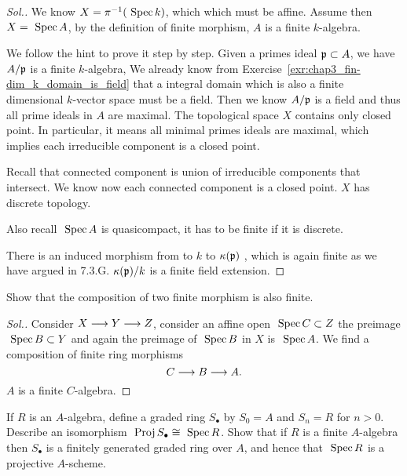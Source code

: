 \documentclass[11pt]{book} %
\begin{document}
\begin{proof}[Sol.]
We know $X=\pi^{-1}(\text{ Spec\,} k)$, which which must be affine. Assume then $X=\text{ Spec\,} A$, by the definition of finite morphism, $A$ is a finite $k$-algebra. 

We follow the hint to prove it step by step. Given a primes ideal ${\mathfrak p}\subset A$, we have $A/{\mathfrak p}$ is a finite $k$-algebra, We already know from Exercise~\ref{exr:chap3_fin-dim_k_domain_is_field} that a integral domain which is also a finite dimensional $k$-vector space must be a field. Then we know $A/{\mathfrak p}$ is a field and thus all prime ideals in $A$ are maximal. The topological space $X$ contains only closed point. In particular, it means all minimal primes ideals are maximal, which implies each irreducible component is a closed point.

Recall that connected component is union of irreducible components that intersect. We know now each connected component is a closed point. $X$ has discrete topology.

Also recall $\text{ Spec\,} A$ is quasicompact, it has to be finite if it is discrete.

There is an induced morphism from to $k$ to $\kappa({\mathfrak p})$ , which is again finite as we have argued in 7.3.G. $\kappa({\mathfrak p})/k$ is a finite field extension.
\end{proof}
\begin{exr}
Show that the composition of two finite morphism is also finite.
\end{exr}
\begin{proof}[Sol.]
Consider $X\longrightarrow Y\longrightarrow Z$, consider an affine open $\text{ Spec\,} C\subset Z$ the preimage $\text{ Spec\,} B\subset Y$ and again the preimage of $\text{ Spec\,} B$ in $X$ is $\text{ Spec\,} A$. We find a composition of  finite ring morphisms
$$
C\longrightarrow B\longrightarrow A.
$$
$A$ is a finite $C$-algebra.
\end{proof}
\begin{exr}
If $R$ is an $A$-algebra, define a graded ring $S_\bullet$ by $S_0=A$ and $S_n=R$ for $n>0$. Describe an isomorphism  $\text{ Proj\,} S_\bullet\cong \text{ Spec\,} R$. Show that if $R$ is a finite $A$-algebra then $S_\bullet$ is a finitely generated graded ring over $A$, and hence that $\text{ Spec\,} R$ is a projective $A$-scheme.
\end{exr}
\end{document}
